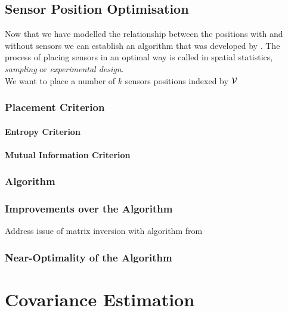 \documentclass[12pt,twoside]{report}
\begin{document}
\subsection{Sensor Position Optimisation}

Now that we have modelled the relationship between the positions with and without sensors we can establish an algorithm that was developed by \citet{krause_near-optimal_2008}. The process of placing sensors in an optimal way is called in spatial statistics, \textit{sampling} or \textit{experimental design}. \\ 

We want to place a number of $k$ sensors positions indexed by $\mathcal{V}$

\subsubsection{Placement Criterion}

\paragraph{Entropy Criterion}


\paragraph{Mutual Information Criterion}

\subsubsection{Algorithm}
 



\subsubsection{Improvements over the Algorithm}

Address issue of matrix inversion with algorithm from \cite[p.~19]{rasmussen_gaussian_2006}


\subsubsection{Near-Optimality of the Algorithm}





\section{Covariance Estimation} \label{sec:cov_est}
\end{document}
